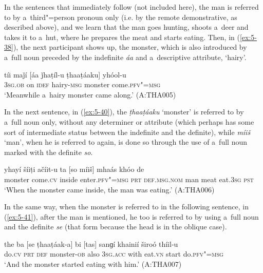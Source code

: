 In the sentences that immediately follow (not included here), the man is referred to by
a~third"=person pronoun only (i.e. by the remote demonstrative, as described above), and we learn
that the man goes hunting, shoots a~deer and takes it to a~hut, where he prepares the meat and
starts eating. Then, in (\ref{ex:5-38}), the next participant shows up, the monster, which is also
introduced by a~full noun preceded by the indefinite \textit{áa} and a~descriptive attribute,
`hairy'.
\begin{exe}
\ex
\label{ex:5-39}
\gll tíi maǰí [áa ǰhaṭíl-u ṭhaaṭáaku] yhóol-u\\
\textsc{3sg.ob} on \textsc{idef} hairy-\textsc{msg} monster come.\textsc{pfv"=msg}\\
\glt `Meanwhile a~hairy monster came along.' (A:THA005)
\end{exe}

In the next sentence, in (\ref{ex:5-40}), the \textit{ṭhaaṭáaku} `monster' is referred to by a~full noun
only, without any determiner or attribute (which perhaps has some sort of intermediate status
between the indefinite and the definite), while \textit{míiš} `man', when he is referred to
again, is done so through the use of a~full noun marked with the definite \textit{so}.
\begin{exe}
\ex
\label{ex:5-40}
\gll [ṭhaaṭáaku] yhayí šíiṭi ačíit-u ta [so míiš] mhaás khóo de\\
monster come.\textsc{cv} inside enter.\textsc{pfv"=msg} \textsc{prt} \textsc{def.msg.nom} man meat eat.\textsc{3sg} \textsc{pst}\\
\glt `When the monster came inside, the man was eating.' (A:THA006)
\end{exe}

In the same way, when the monster is referred to in the following sentence, in (\ref{ex:5-41}), after the man is mentioned, he too is referred to by using a~full noun and the definite \textit{se} (that form because the head is in the oblique case).
\begin{exe}
\ex
\label{ex:5-41}
\gll the ba [se ṭhaaṭáak-a] bi [tas] sanɡí khainií široó thíil-u\\
do.\textsc{cv} \textsc{prt} \textsc{def} monster-\textsc{ob} also \textsc{3sg.acc} with eat.\textsc{vn} start do.\textsc{pfv"=msg}\\
\glt `And the monster started eating with him.' (A:THA007)
\end{exe}

